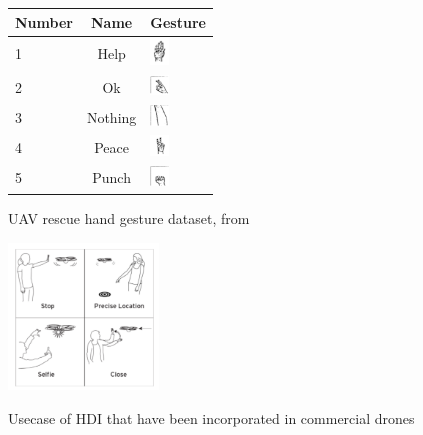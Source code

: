 \begin{margintable}%
  \raggedright
  \footnotesize%
    \begin{tabular}{lcl}
      \toprule
      \textbf{Number}          & \textbf{Name} & \textbf{Gesture} \\
                                   
      \midrule
      1               & Help  
      & \includegraphics[width=0.5cm]{images/hdi_discussion/Help.PNG}    \\
      2   &  Ok  
      & \includegraphics[width=0.5cm]{images/hdi_discussion/Ok.PNG}     \\ 
      3        & Nothing 
      & \includegraphics[width=0.5cm]{images/hdi_discussion/Nothing.PNG}     \\ 
      4        & Peace 
      & \includegraphics[width=0.5cm]{images/hdi_discussion/Peace.PNG}     \\ 
      5        & Punch 
      & \includegraphics[width=0.5cm]{images/hdi_discussion/Punch.PNG}     \\ 
      
      \bottomrule
    \end{tabular}
  \caption{UAV rescue hand gesture dataset, from \cite{liu_szirányi_2021}}
  \label{tab:rescue_dataset}
\end{margintable}

\begin{marginfigure}%
  \vspace{1cm}
  \includegraphics[width=4cm]{images/hdi_discussion/drone_and_me.PNG}
  \caption{Usecase of HDI that have been incorporated in commercial drones \cite{cauchard_e_zhai_landay_2015}}
  \label{fig:selfie2}
\end{marginfigure}


